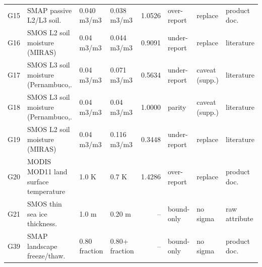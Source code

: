 \begin{longtable}{@{}l p{2.05cm} p{1.6cm} p{1.6cm} r p{1.25cm} p{1.4cm} p{1.35cm}@{}}
G15 & SMAP passive L2\slash L3 soil. & 0.040 m3/m3 & 0.038 m3/m3 & 1.0526 & over-report & replace & product doc. \\
G16 & SMOS L2 soil moisture (MIRAS) & 0.04 m3/m3 & 0.044 m3/m3 & 0.9091 & under-report & replace & literature \\
G17 & SMOS L3 soil moisture (Pernambuco,. & 0.04 m3/m3 & 0.071 m3/m3 & 0.5634 & under-report & caveat (supp.) & literature \\
G18 & SMOS L3 soil moisture (Pernambuco,. & 0.04 m3/m3 & 0.04 m3/m3 & 1.0000 & parity & caveat (supp.) & literature \\
G19 & SMOS L2 soil moisture (MIRAS) & 0.04 m3/m3 & 0.116 m3/m3 & 0.3448 & under-report & replace & literature \\
G20 & MODIS MOD11 land surface temperature & 1.0 K & 0.7 K & 1.4286 & over-report & replace & product doc. \\
G21 & SMOS thin sea ice thickness. & 1.0 m & 0.20 m & -- & bound-only & no sigma & raw attribute \\
G39 & SMAP landscape freeze\slash thaw. & 0.80 fraction & 0.80+ fraction & -- & bound-only & no sigma & product doc. \\
\bottomrule
\end{longtable}
